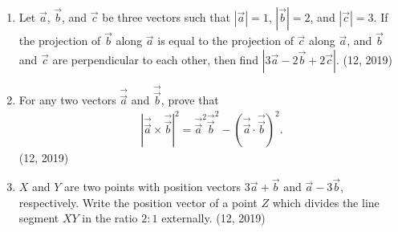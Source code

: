 \begin{enumerate}[label=\thesubsection.\arabic*,ref=\thesubsection.\theenumi]
	\item Let $\overrightarrow{a}$, $\overrightarrow{b}$, and $\overrightarrow{c}$ be three vectors such that $|\overrightarrow{a}| = 1$, $|\overrightarrow{b}| = 2$, and $|\overrightarrow{c}| = 3$. If the projection of $\overrightarrow{b}$ along $\overrightarrow{a}$ is equal to the projection of $\overrightarrow{c}$ along $\overrightarrow{a}$, and $\overrightarrow{b}$ and $\overrightarrow{c}$ are perpendicular to each other, then find $|3\overrightarrow{a} - 2\overrightarrow{b} + 2\overrightarrow{c}|$. \hfill (12, 2019)
	\item For any two vectors $\overrightarrow{\vec{a}}$ and $\overrightarrow{\vec{b}}$, prove that
	\begin{align*}
	|\overrightarrow{\vec{a}} \times \overrightarrow{\vec{b}}|^2 = \overrightarrow{\vec{a}}^2 \overrightarrow{\vec{b}}^2 - (\overrightarrow{\vec{a}} \cdot \overrightarrow{\vec{b}})^2.
	\end{align*} \hfill (12, 2019)
	\item $X$ and $Y$ are two points with position vectors $3\overrightarrow{a} + \overrightarrow{b}$ and $\overrightarrow{a} - 3\overrightarrow{b}$, respectively. Write the position vector of a point $Z$ which divides the line segment $XY$ in the ratio $2:1$ externally. \hfill (12, 2019)
\end{enumerate}
